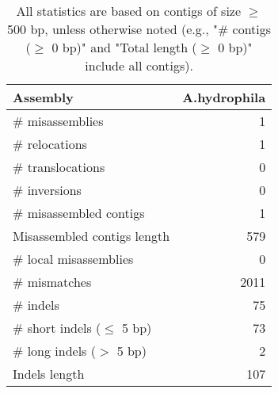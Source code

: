 \documentclass[12pt,a4paper]{article}
\begin{document}
\begin{table}[ht]
\begin{center}
\caption{All statistics are based on contigs of size $\geq$ 500 bp, unless otherwise noted (e.g., "\# contigs ($\geq$ 0 bp)" and "Total length ($\geq$ 0 bp)" include all contigs).}
\begin{tabular}{|l*{1}{|r}|}
\hline
Assembly & A.hydrophila \\ \hline
\# misassemblies & 1 \\ \hline
\hspace{5mm}\# relocations & 1 \\ \hline
\hspace{5mm}\# translocations & 0 \\ \hline
\hspace{5mm}\# inversions & 0 \\ \hline
\# misassembled contigs & 1 \\ \hline
Misassembled contigs length & 579 \\ \hline
\# local misassemblies & 0 \\ \hline
\# mismatches & 2011 \\ \hline
\# indels & 75 \\ \hline
\hspace{5mm}\# short indels ($\leq$ 5 bp) & 73 \\ \hline
\hspace{5mm}\# long indels ($>$ 5 bp) & 2 \\ \hline
Indels length & 107 \\ \hline
\end{tabular}
\end{center}
\end{table}
\end{document}
